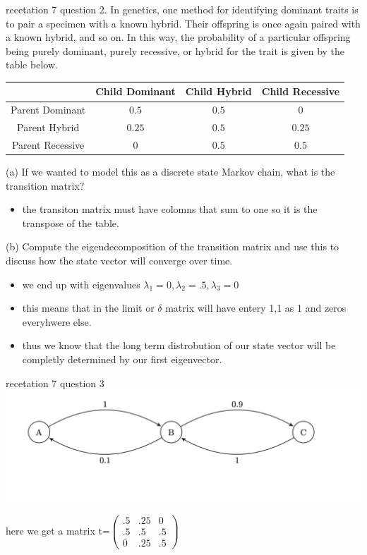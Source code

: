 \documentclass[10pt]{article}
\begin{document}
recetation 7 question 2. In genetics, one method for identifying dominant traits is to pair a specimen with a known hybrid. Their offspring is once again paired with a known hybrid, and so on. In this way, the probability of a particular offspring being purely dominant, purely recessive, or hybrid for the trait is given by the table below.
\begin{tabular}{cccc}
\hline & Child Dominant & Child Hybrid & Child Recessive \\
\hline Parent Dominant & $0.5$ & $0.5$ & 0 \\
\hline Parent Hybrid & $0.25$ & $0.5$ & $0.25$ \\
\hline Parent Recessive & 0 & $0.5$ & $0.5$ \\
\hline
\end{tabular}
(a) If we wanted to model this as a discrete state Markov chain, what is the transition matrix?
\begin{itemize}
    \item the transiton matrix must have colomns that sum to one so it is the transpose of the table. 
\end{itemize}
(b) Compute the eigendecomposition of the transition matrix and use this to discuss how the state vector will converge over time.
\begin{itemize}
    \item we end up with eigenvalues $\lambda_1=0,\lambda_2=.5,\lambda_3=0$
    \item this means that in the limit or $\delta$ matrix will have entery 1,1 as 1 and zeros everyhwere else. 
    \item thus we know that the long term distrobution of our state vector will be completly determined by our first eigenvector. 
\end{itemize}
recetation 7 question 3
\\\includegraphics[width=15cm]{final practice/recetation_7_quetion_3.jpg}
\item here we get a matrix t=$\begin{pmatrix}
    .5&.25&0\\.5&.5&.5\\0&.25&.5
\end{pmatrix}$
\end{document}
